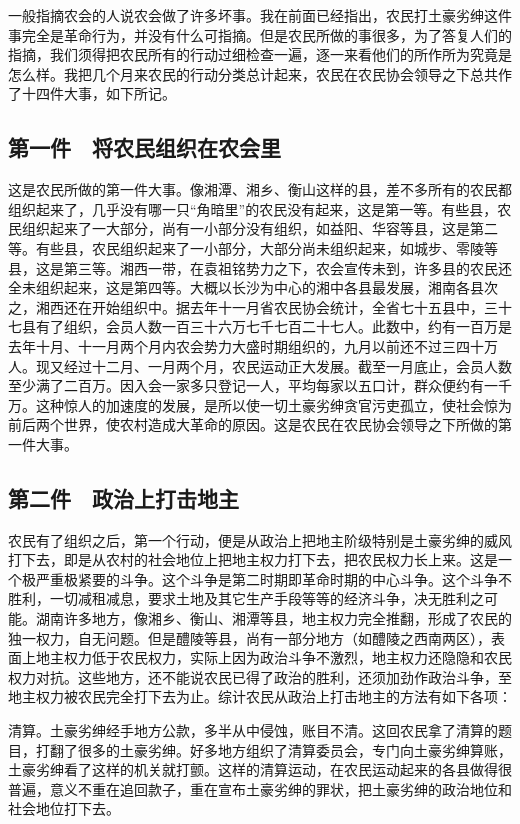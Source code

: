 一般指摘农会的人说农会做了许多坏事。我在前面已经指出，农民打土豪劣绅这件事完全是革命行为，并没有什么可指摘。但是农民所做的事很多，为了答复人们的指摘，我们须得把农民所有的行动过细检查一遍，逐一来看他们的所作所为究竟是怎么样。我把几个月来农民的行动分类总计起来，农民在农民协会领导之下总共作了十四件大事，如下所记。

\subsection*{第一件　将农民组织在农会里}

这是农民所做的第一件大事。像湘潭、湘乡、衡山这样的县，差不多所有的农民都组织起来了，几乎没有哪一只“角暗里”的农民没有起来，这是第一等。有些县，农民组织起来了一大部分，尚有一小部分没有组织，如益阳、华容等县，这是第二等。有些县，农民组织起来了一小部分，大部分尚未组织起来，如城步、零陵等县，这是第三等。湘西一带，在袁祖铭势力之下，农会宣传未到，许多县的农民还全未组织起来，这是第四等。大概以长沙为中心的湘中各县最发展，湘南各县次之，湘西还在开始组织中。据去年十一月省农民协会统计，全省七十五县中，三十七县有了组织，会员人数一百三十六万七千七百二十七人。此数中，约有一百万是去年十月、十一月两个月内农会势力大盛时期组织的，九月以前还不过三四十万人。现又经过十二月、一月两个月，农民运动正大发展。截至一月底止，会员人数至少满了二百万。因入会一家多只登记一人，平均每家以五口计，群众便约有一千万。这种惊人的加速度的发展，是所以使一切土豪劣绅贪官污吏孤立，使社会惊为前后两个世界，使农村造成大革命的原因。这是农民在农民协会领导之下所做的第一件大事。

\subsection*{第二件　政治上打击地主}

农民有了组织之后，第一个行动，便是从政治上把地主阶级特别是土豪劣绅的威风打下去，即是从农村的社会地位上把地主权力打下去，把农民权力长上来。这是一个极严重极紧要的斗争。这个斗争是第二时期即革命时期的中心斗争。这个斗争不胜利，一切减租减息，要求土地及其它生产手段等等的经济斗争，决无胜利之可能。湖南许多地方，像湘乡、衡山、湘潭等县，地主权力完全推翻，形成了农民的独一权力，自无问题。但是醴陵等县，尚有一部分地方（如醴陵之西南两区），表面上地主权力低于农民权力，实际上因为政治斗争不激烈，地主权力还隐隐和农民权力对抗。这些地方，还不能说农民已得了政治的胜利，还须加劲作政治斗争，至地主权力被农民完全打下去为止。综计农民从政治上打击地主的方法有如下各项：

清算。土豪劣绅经手地方公款，多半从中侵蚀，账目不清。这回农民拿了清算的题目，打翻了很多的土豪劣绅。好多地方组织了清算委员会，专门向土豪劣绅算账，土豪劣绅看了这样的机关就打颤。这样的清算运动，在农民运动起来的各县做得很普遍，意义不重在追回款子，重在宣布土豪劣绅的罪状，把土豪劣绅的政治地位和社会地位打下去。

